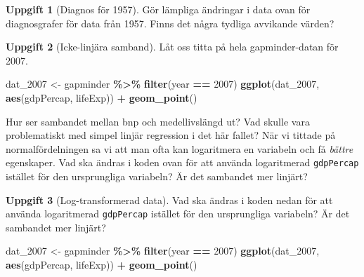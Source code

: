 \documentclass[
]{book}
\newenvironment{Shaded}{\begin{snugshade}}{\end{snugshade}}
\newcommand{\DecValTok}[1]{\textcolor[rgb]{0.00,0.00,0.81}{#1}}
\newcommand{\FunctionTok}[1]{\textcolor[rgb]{0.13,0.29,0.53}{\textbf{#1}}}
\newcommand{\NormalTok}[1]{#1}
\newcommand{\OtherTok}[1]{\textcolor[rgb]{0.56,0.35,0.01}{#1}}
\newcommand{\SpecialCharTok}[1]{\textcolor[rgb]{0.81,0.36,0.00}{\textbf{#1}}}
\theoremstyle{definition}
\theoremstyle{definition}
\theoremstyle{definition}
\newtheorem{exercise}{Uppgift}[chapter]
\theoremstyle{definition}
\theoremstyle{remark}
\begin{document}
\begin{exercise}[Diagnos för 1957]
Gör lämpliga ändringar i data ovan för diagnosgrafer för data från 1957. Finns det några tydliga avvikande värden?
\end{exercise}

\begin{exercise}[Icke-linjära samband]
Låt oss titta på hela gapminder-datan för 2007.

\begin{Shaded}
\begin{Highlighting}[]
\NormalTok{dat\_2007 }\OtherTok{\textless{}{-}}\NormalTok{ gapminder }\SpecialCharTok{\%\textgreater{}\%} \FunctionTok{filter}\NormalTok{(year }\SpecialCharTok{==} \DecValTok{2007}\NormalTok{)}
\FunctionTok{ggplot}\NormalTok{(dat\_2007, }\FunctionTok{aes}\NormalTok{(gdpPercap, lifeExp)) }\SpecialCharTok{+} \FunctionTok{geom\_point}\NormalTok{()}
\end{Highlighting}
\end{Shaded}

Hur ser sambandet mellan bnp och medellivslängd ut? Vad skulle vara problematiskt med simpel linjär regression i det här fallet? När vi tittade på normalfördelningen sa vi att man ofta kan logaritmera en variabeln och få \emph{bättre} egenskaper. Vad ska ändras i koden ovan för att använda logaritmerad \texttt{gdpPercap} istället för den ursprungliga variabeln? Är det sambandet mer linjärt?
\end{exercise}

\begin{exercise}[Log-transformerad data]

Vad ska ändras i koden nedan för att använda logaritmerad \texttt{gdpPercap} istället för den ursprungliga variabeln? Är det sambandet mer linjärt?

\begin{Shaded}
\begin{Highlighting}[]
\NormalTok{dat\_2007 }\OtherTok{\textless{}{-}}\NormalTok{ gapminder }\SpecialCharTok{\%\textgreater{}\%} \FunctionTok{filter}\NormalTok{(year }\SpecialCharTok{==} \DecValTok{2007}\NormalTok{)}
\FunctionTok{ggplot}\NormalTok{(dat\_2007, }\FunctionTok{aes}\NormalTok{(gdpPercap, lifeExp)) }\SpecialCharTok{+} \FunctionTok{geom\_point}\NormalTok{()}
\end{Highlighting}
\end{Shaded}

\end{exercise}
\end{document}
